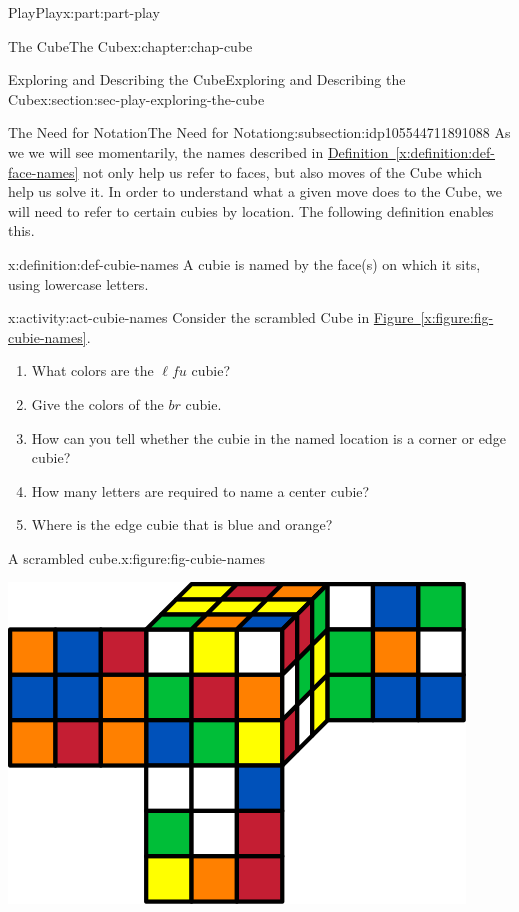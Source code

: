 \documentclass[oneside,10pt,]{book}
\newcommand{\xreffont}{\relax}
\numberwithin{equation}{section}
\begin{document}
\begin{partptx}{Play}{}{Play}{}{}{x:part:part-play}
\begin{chapterptx}{The Cube}{}{The Cube}{}{}{x:chapter:chap-cube}
\begin{sectionptx}{Exploring and Describing the Cube}{}{Exploring and Describing the Cube}{}{}{x:section:sec-play-exploring-the-cube}
\begin{subsectionptx}{The Need for Notation}{}{The Need for Notation}{}{}{g:subsection:idp105544711891088}
As we we will see momentarily, the names described in \hyperref[x:definition:def-face-names]{Definition~{\xreffont\ref{x:definition:def-face-names}}} not only help us refer to faces, but also moves of the Cube which help us solve it. In order to understand what a given move does to the Cube, we will need to refer to certain cubies by location. The following definition enables this.%
\begin{definition}{}{x:definition:def-cubie-names}%
A cubie is named by the face(s) on which it sits, using lowercase letters.%
\end{definition}
\begin{activity}{}{x:activity:act-cubie-names}%
Consider the scrambled Cube in \hyperref[x:figure:fig-cubie-names]{Figure~{\xreffont\ref{x:figure:fig-cubie-names}}}.%
%
\begin{enumerate}
\item{}What colors are the \(\ell f u\) cubie?%
\item{}Give the colors of the \(br\) cubie.%
\item{}How can you tell whether the cubie in the named location is a corner or edge cubie?%
\item{}How many letters are required to name a center cubie?%
\item{}Where is the edge cubie that is blue and orange?%
\end{enumerate}
\begin{figureptx}{A scrambled cube.}{x:figure:fig-cubie-names}{}%
\begin{image}{0.25}{0.5}{0.25}%
\includegraphics[width=\linewidth]{./images/cubie_names.svg}
\end{image}%

\end{figureptx}
\end{activity}
\end{subsectionptx}
\end{sectionptx}
\end{chapterptx}
\end{partptx}
\end{document}
